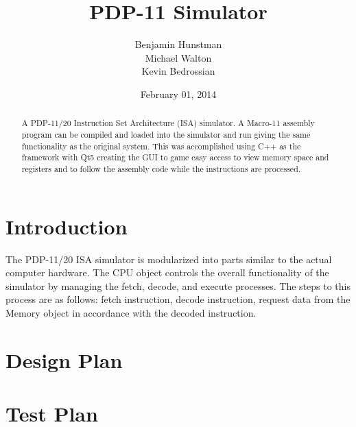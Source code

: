 \documentclass[]{report}   %
\begin{document}
\raggedright{}  %

\title{PDP-11 Simulator}   %
\author{Benjamin Hunstman \\
Michael Walton\\
Kevin Bedrossian}         %
\date{February 01, 2014}    %
\maketitle

\begin{abstract}
  A PDP-11/20 Instruction Set Architecture (ISA) simulator.  A Macro-11 assembly program can be compiled and loaded into the simulator and run giving the same functionality as the original system.  This was accomplished using C++ as the framework with Qt5 creating the GUI to game easy access to view memory space and registers and to follow the assembly code while the instructions are processed.
\end{abstract}

\tableofcontents

\chapter{Introduction}
 The PDP-11/20 ISA simulator is modularized into parts similar to the actual computer hardware.  The CPU object controls the overall functionality of the simulator by managing the fetch, decode, and execute processes.  The steps to this process are as follows: fetch instruction, decode instruction, request data from the Memory object in accordance with the decoded instruction.  

\chapter{Design Plan}


\chapter{Test Plan}


\end{document}

